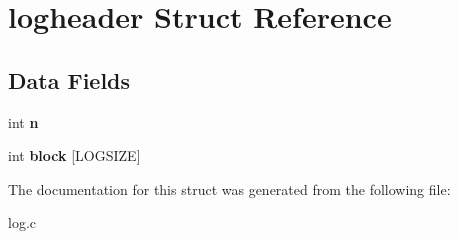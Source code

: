 \hypertarget{structlogheader}{}\section{logheader Struct Reference}
\label{structlogheader}
\subsection*{Data Fields}
\begin{DoxyCompactItemize}
\item 
\mbox{\label{structlogheader_a50b276b70d44ae77497ef1d71d182875}} 
int {\bfseries n}
\item 
\mbox{\label{structlogheader_a020db7fe04c7ce6b8f4aee2092576c2c}} 
int {\bfseries block} \mbox{[}L\+O\+G\+S\+I\+ZE\mbox{]}
\end{DoxyCompactItemize}


The documentation for this struct was generated from the following file\+:\begin{DoxyCompactItemize}
\item 
log.\+c\end{DoxyCompactItemize}
